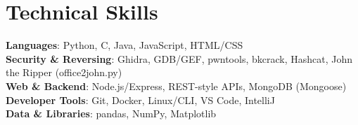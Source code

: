 \documentclass[letterpaper,11pt]{article}
\begin{document}
\section{Technical Skills}
 \begin{itemize}[leftmargin=0.15in, label={}]
    \small{\item{
     \textbf{Languages}{: Python, C, Java, JavaScript, HTML/CSS} \\
     \textbf{Security \& Reversing}{: Ghidra, GDB/GEF, pwntools, bkcrack, Hashcat, John the Ripper (office2john.py)} \\
     \textbf{Web \& Backend}{: Node.js/Express, REST-style APIs, MongoDB (Mongoose)} \\
     \textbf{Developer Tools}{: Git, Docker, Linux/CLI, VS Code, IntelliJ} \\
     \textbf{Data \& Libraries}{: pandas, NumPy, Matplotlib}
    }}
\end{itemize}
\end{document}
